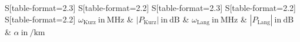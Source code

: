 \begin{table}
    \centering
    \caption{Frequenz $\omega$ und Betrag der Amplitude $P$ der Peaks in der FFT für das kurze und das lange Kabel, sowie mit \eqref{eq:DaempfungB} berechnete Dämpfung}
    \label{tab:DaempfungWerteB}
    \begin{tabular}{
	S[table-format=2.3]
	S[table-format=2.2]
	S[table-format=2.3]
	S[table-format=2.2]
	S[table-format=2.2]
	}
	\toprule
	{$\omega_\text{Kurz} \ \mathrm{in} \ \si{\mega\hertz}$}		& {$|P_\text{Kurz}| \ \mathrm{in} \ \si{\deci\bel}$}		& 
	{$\omega_\text{Lang} \ \mathrm{in} \ \si{\mega\hertz}$}		& {$|P_\text{Lang}| \ \mathrm{in} \ \si{\deci\bel}$}		& 
	{$\alpha \ \mathrm{in} \ \si{\per\kilo\meter}$}		\\ 
	\midrule
    
    \bottomrule
    \end{tabular}
    \end{table}
